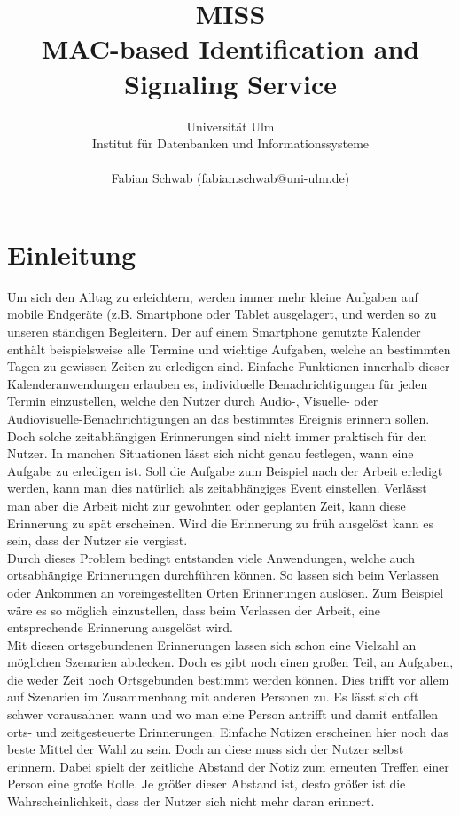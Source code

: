 \documentclass[]{report}
\title{MISS \\ MAC-based Identification and Signaling Service}
\author{Universität Ulm \\ Institut für Datenbanken und Informationssysteme \\ \\ Fabian Schwab (fabian.schwab@uni-ulm.de)}
\begin{document}
\maketitle

\chapter{Einleitung}
Um sich den Alltag zu erleichtern, werden immer mehr kleine Aufgaben auf mobile Endgeräte (z.B. Smartphone oder Tablet ausgelagert, und werden so zu unseren ständigen Begleitern. Der auf einem Smartphone genutzte Kalender enthält beispielsweise alle Termine und wichtige Aufgaben, welche an bestimmten Tagen zu gewissen Zeiten zu erledigen sind. Einfache Funktionen innerhalb dieser Kalenderanwendungen erlauben es, individuelle Benachrichtigungen für jeden Termin einzustellen, welche den Nutzer durch Audio-, Visuelle- oder Audiovisuelle-Benachrichtigungen an das bestimmtes Ereignis erinnern sollen. Doch solche zeitabhängigen Erinnerungen sind nicht immer praktisch für den Nutzer. In manchen Situationen lässt sich nicht genau festlegen, wann eine Aufgabe zu erledigen ist. Soll die Aufgabe zum Beispiel nach der Arbeit erledigt werden, kann man dies natürlich als zeitabhängiges Event einstellen. Verlässt man aber die Arbeit nicht zur gewohnten oder geplanten Zeit, kann diese Erinnerung zu spät erscheinen. Wird die Erinnerung zu früh ausgelöst kann es sein, dass der Nutzer sie vergisst. \\
Durch dieses Problem bedingt entstanden viele Anwendungen, welche auch ortsabhängige Erinnerungen durchführen können. So lassen sich beim Verlassen oder Ankommen an voreingestellten Orten Erinnerungen auslösen. Zum Beispiel wäre es so möglich einzustellen, dass beim Verlassen der Arbeit, eine entsprechende Erinnerung ausgelöst wird. \\
Mit diesen ortsgebundenen Erinnerungen lassen sich schon eine Vielzahl an möglichen Szenarien abdecken. Doch es gibt noch einen großen Teil, an Aufgaben, die weder Zeit noch Ortsgebunden bestimmt werden können. Dies trifft vor allem auf Szenarien im Zusammenhang mit anderen Personen zu. Es lässt sich oft schwer vorausahnen wann und wo man eine Person antrifft und damit entfallen orts- und zeitgesteuerte Erinnerungen. Einfache Notizen erscheinen hier noch das beste Mittel der Wahl zu sein. Doch an diese muss sich der Nutzer selbst erinnern. Dabei spielt der zeitliche Abstand der Notiz zum erneuten Treffen einer Person eine große Rolle. Je größer dieser Abstand ist, desto größer ist die Wahrscheinlichkeit, dass der Nutzer sich nicht mehr daran erinnert. \\
\end{document}
